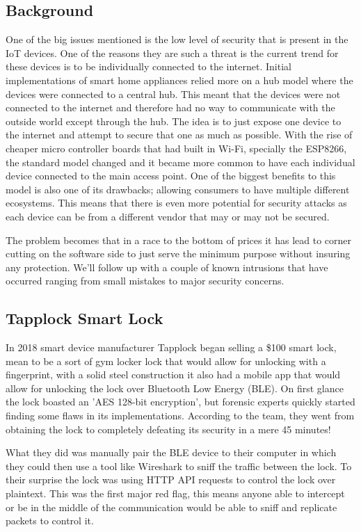 \documentclass[acmlarge]{acmart}
\begin{document}
\subsection{Background}

One of the big issues mentioned is the low level of security that is present in the IoT devices. One of the reasons they are such a threat is the current trend for these devices is to be individually connected to the internet. Initial implementations of smart home appliances relied more on a hub model where the devices were connected to a central hub. This meant that the devices were not connected to the internet and therefore had no way to communicate with the outside world except through the hub. The idea is to just expose one device to the internet and attempt to secure that one as much as possible. With the rise of cheaper micro controller boards that had built in Wi-Fi, specially the ESP8266, the standard model changed and it became more common to have each individual device connected to the main access point. One of the biggest benefits to this model is also one of its drawbacks; allowing consumers to have multiple different ecosystems. This means that there is even more potential for security attacks as each device can be from a different vendor that may or may not be secured.  

The problem becomes that in a race to the bottom of prices it has lead to corner cutting on the software side to just serve the minimum purpose without insuring any protection. We'll follow up with a couple of known intrusions that have occurred ranging from small mistakes to major security concerns. 


\subsection{Tapplock Smart Lock}

In 2018 smart device manufacturer Tapplock began selling a \$100 smart lock, mean to be a sort of gym locker lock that would allow for unlocking with a fingerprint, with a solid steel construction it also had a mobile app that would allow for unlocking the lock over Bluetooth Low Energy (BLE).
On first glance the lock boasted an 'AES 128-bit encryption', but forensic experts quickly started finding some flaws in its implementations. According to the team, they went from obtaining the lock to completely defeating its security in a mere 45 minutes! \cite{Ken_2018}

What they did was manually pair the BLE device to their computer in which they could then use a tool like Wireshark to sniff the traffic between the lock. To their surprise the lock was using HTTP API requests to control the lock over plaintext. This was the first major red flag, this means anyone able to intercept or be in the middle of the communication would be able to sniff and replicate packets to control it. 
\end{document}
